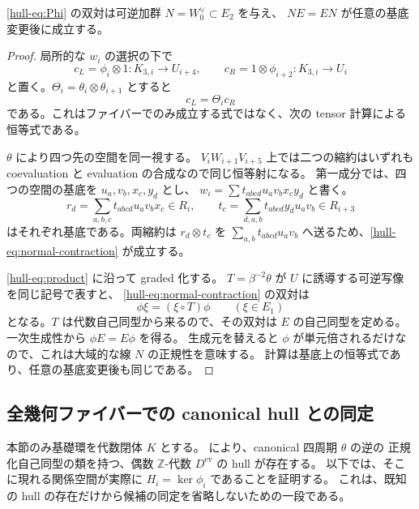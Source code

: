 \begin{lemma}
\label{hull-lem:normal}
\eqref{hull-eq:Phi} の双対は可逆加群 $N=W_0^{\vee}\subset E_2$ を与え、
$NE=EN$ が任意の基底変更後に成立する。
\end{lemma}
\begin{proof}
局所的な $w_i$ の選択の下で
\[
 c_L=\phi_i\otimes1:K_{3,i}\longrightarrow U_{i+4},\qquad
 c_R=1\otimes\phi_{i+2}:K_{3,i}\longrightarrow U_i
\]
と置く。$\Theta_i=\theta_i\otimes\theta_{i+1}$ とすると
\[
 c_L=\Theta_i c_R
 \tag{UH-11}\label{hull-eq:normal-contraction}
\]
である。これはファイバーでのみ成立する式ではなく、次の tensor 計算による恒等式である。

$\theta$ により四つ先の空間を同一視する。
$V_iW_{i+1}V_{i+5}$ 上では二つの縮約はいずれも
coevaluation と evaluation の合成なので同じ恒等射になる。
第一成分では、四つの空間の基底を $u_a,v_b,x_c,y_d$ とし、
$w_i=\sum t_{abcd}u_a v_b x_c y_d$ と書く。
\[
 r_d=\sum_{a,b,c}t_{abcd}u_av_bx_c\in R_i,\qquad
 t_c=\sum_{d,a,b}t_{abcd}y_du_av_b\in R_{i+3}
\]
はそれぞれ基底である。両縮約は $r_d\otimes t_c$ を
$\sum_{a,b}t_{abcd}u_av_b$ へ送るため、\eqref{hull-eq:normal-contraction} が成立する。

\eqref{hull-eq:product} に沿って graded 化する。
$T=\beta^{-2}\theta$ が $U$ に誘導する可逆写像を同じ記号で表すと、
\eqref{hull-eq:normal-contraction} の双対は
\[
 \phi\xi=(\xi\circ T)\phi\qquad(\xi\in E_1)
 \tag{UH-12}\label{hull-eq:graded-normality}
\]
となる。$T$ は代数自己同型から来るので、その双対は $E$ の自己同型を定める。
一次生成性から $\phi E=E\phi$ を得る。
生成元を替えると $\phi$ が単元倍されるだけなので、これは大域的な線 $N$ の正規性を意味する。
計算は基底上の恒等式であり、任意の基底変更後も同じである。
\end{proof}

\subsection{全幾何ファイバーでの canonical hull との同定}

本節のみ基礎環を代数閉体 $K$ とする。
\cite[Theorem 6.1]{VdB2011} により、canonical 四周期 $\theta$ の逆の
正規化自己同型の類を持つ、偶数 $\mathbb Z$-代数 $D^{\mathrm{ev}}$ の hull が存在する。
以下では、そこに現れる関係空間が実際に $H_i=\ker\phi_i$ であることを証明する。
これは、既知の hull の存在だけから候補の同定を省略しないための一段である。

